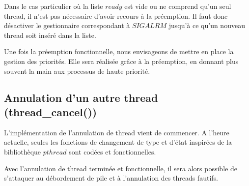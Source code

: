 Dans le cas particulier où la liste $ready$ est vide ou ne comprend qu'un seul thread, il n'est pas nécessaire d'avoir recours à la préemption. Il faut donc désactiver le gestionnaire correspondant à $SIGALRM$ jusqu'à ce qu'un nouveau thread soit inséré dans la liste.

Une fois la préemption fonctionnelle, nous envisageons de mettre en place la gestion des priorités. Elle sera réalisée grâce à la préemption, en donnant plus souvent la main aux processus de haute priorité.
 
\subsection{Annulation d'un autre thread (thread\_cancel())}
L'implémentation de l'annulation de thread vient de commencer. A l'heure
actuelle, seules les fonctions de changement de type et d'état inspirées de la
bibliothèque $pthread$ sont codées et fonctionnelles. 

Avec l'annulation de thread terminée et fonctionnelle, il sera alors possible
de s'attaquer au débordement de pile et à l'annulation des threads fautifs.
